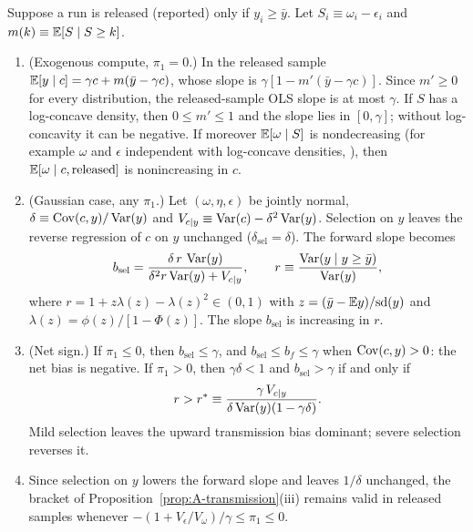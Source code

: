 \begin{proposition}\label{prop:selection}
Suppose a run is released (reported) only if $y_i\ge\bar y$. Let $S_i\equiv\omega_i-\epsilon_i$ and
$m(k)\equiv\mathbb{E}[S\mid S\ge k]$.
\begin{enumerate}
\item[(i)] (Exogenous compute, $\pi_1=0$.) In the released sample $\mathbb{E}[y\mid c]=\gamma c+m(\bar y-\gamma c)$, whose slope is
$\gamma[1-m'(\bar y-\gamma c)]$. Since $m'\ge0$ for every distribution, the released-sample OLS slope is at most $\gamma$.
If $S$ has a log-concave density, then $0\le m'\le1$ \citep{bagnoli2005logconcave} and the slope lies in $[0,\gamma]$;
without log-concavity it can be negative. If moreover $\mathbb{E}[\omega\mid S]$ is nondecreasing (for example $\omega$ and
$\epsilon$ independent with log-concave densities, \citealp{efron1965increasing}), then $\mathbb{E}[\omega\mid c,\text{released}]$
is nonincreasing in $c$.
\item[(ii)] (Gaussian case, any $\pi_1$.) Let $(\omega,\eta,\epsilon)$ be jointly normal, $\delta\equiv\operatorname{Cov}(c,y)/\operatorname{Var}(y)$ and
$V_{c|y}\equiv\operatorname{Var}(c)-\delta^2\operatorname{Var}(y)$. Selection on $y$ leaves the reverse regression of $c$ on $y$ unchanged
($\delta_{\text{sel}}=\delta$). The forward slope becomes
\[
b_{\text{sel}}=\frac{\delta\,r\,\operatorname{Var}(y)}{\delta^2r\operatorname{Var}(y)+V_{c|y}},
\qquad r\equiv\frac{\operatorname{Var}(y\mid y\ge\bar y)}{\operatorname{Var}(y)},
\]
where $r=1+z\lambda(z)-\lambda(z)^2\in(0,1)$
with $z=(\bar y-\mathbb{E} y)/\mathrm{sd}(y)$ and $\lambda(z)=\phi(z)/[1-\Phi(z)]$. The slope $b_{\text{sel}}$ is increasing in $r$.
\item[(iii)] (Net sign.) If $\pi_1\le0$, then $b_{\text{sel}}\le\gamma$, and $b_{\text{sel}}\le b_f\le\gamma$ when
$\operatorname{Cov}(c,y)>0$: the net bias is negative. If $\pi_1>0$, then
$\gamma\delta<1$ and $b_{\text{sel}}>\gamma$ if and only if
\[
r>r^*\equiv\frac{\gamma\,V_{c|y}}{\delta\operatorname{Var}(y)(1-\gamma\delta)}.
\]
Mild selection leaves the upward transmission bias dominant; severe selection reverses it.
\item[(iv)] Since selection on $y$ lowers the forward slope and leaves $1/\delta$ unchanged, the bracket of
Proposition~\ref{prop:A-transmission}(iii) remains valid in released samples whenever
$-(1+V_\epsilon/V_\omega)/\gamma\le\pi_1\le0$.
\end{enumerate}
\end{proposition}

